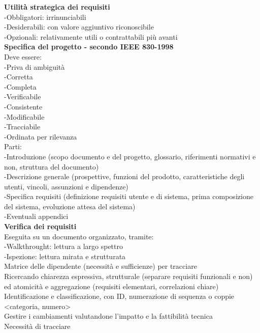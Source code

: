 \documentclass{article}
\begin{document}
		\textbf{Utilità strategica dei requisiti}\\
		-Obbligatori: irrinunciabili\\
		-Desiderabili: con valore aggiuntivo riconoscibile\\
		-Opzionali: relativamente utili o contrattabili più avanti\\
		
		\textbf{Specifica del progetto - secondo IEEE 830-1998}\\
		Deve essere:\\
		-Priva di ambiguità\\
		-Corretta\\
		-Completa\\
		-Verificabile\\
		-Consistente\\
		-Modificabile\\
		-Tracciabile\\
		-Ordinata per rilevanza\\
		
		Parti:\\
		-Introduzione (scopo documento e del progetto, glossario, riferimenti normativi e non, struttura del documento)\\
		-Descrizione generale (prospettive, funzioni del prodotto, caratteristiche degli utenti, vincoli, assunzioni e dipendenze)\\
		-Specifica requisiti (definizione requisiti utente e di sistema, prima composizione del sistema, evoluzione attesa del sistema)\\
		-Eventuali appendici\\
		
		\textbf{Verifica dei requisiti}\\
		Eseguita su un documento organizzato, tramite:\\
		-Walkthrought: lettura a largo spettro\\
		-Ispezione: lettura mirata e strutturata\\
		Matrice delle dipendente (necessità e sufficienze) per tracciare\\
		Ricercando chiarezza espressiva, strutturale (separare requisiti funzionali e non) ed atomicità e aggregazione (requisiti elementari, correlazioni chiare)\\
		
		Identificazione e classificazione, con ID, numerazione di sequenza o coppie <categoria, numero>\\
		Gestire i cambiamenti valutandone l'impatto e la fattibilità tecnica\\
		Necessità di tracciare\\
		
\end{document}
